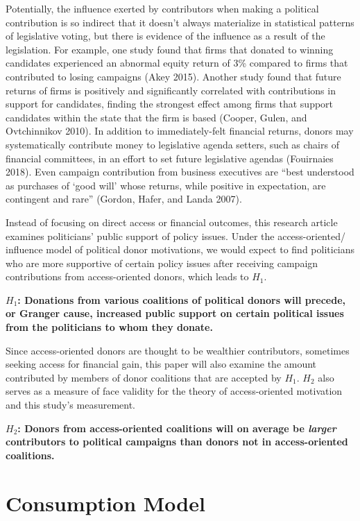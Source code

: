 \documentclass[12pt,]{article}
\begin{document}
Potentially, the influence exerted by contributors when making a
political contribution is so indirect that it doesn't always materialize
in statistical patterns of legislative voting, but there is evidence of
the influence as a result of the legislation. For example, one study
found that firms that donated to winning candidates experienced an
abnormal equity return of 3\% compared to firms that contributed to
losing campaigns (Akey 2015). Another study found that future returns of
firms is positively and significantly correlated with contributions in
support for candidates, finding the strongest effect among firms that
support candidates within the state that the firm is based (Cooper,
Gulen, and Ovtchinnikov 2010). In addition to immediately-felt financial
returns, donors may systematically contribute money to legislative
agenda setters, such as chairs of financial committees, in an effort to
set future legislative agendas (Fouirnaies 2018). Even campaign
contribution from business executives are ``best understood as purchases
of `good will' whose returns, while positive in expectation, are
contingent and rare'' (Gordon, Hafer, and Landa 2007).

Instead of focusing on direct access or financial outcomes, this
research article examines politicians' public support of policy issues.
Under the access-oriented/ influence model of political donor
motivations, we would expect to find politicians who are more supportive
of certain policy issues after receiving campaign contributions from
access-oriented donors, which leads to \(H_{1}\).

\textbf{\(H_{1}\): Donations from various coalitions of political donors
will precede, or Granger cause, increased public support on certain
political issues from the politicians to whom they donate.}

Since access-oriented donors are thought to be wealthier contributors,
sometimes seeking access for financial gain, this paper will also
examine the amount contributed by members of donor coalitions that are
accepted by \(H_{1}\). \(H_{2}\) also serves as a measure of face
validity for the theory of access-oriented motivation and this study's
measurement.

\textbf{\(H_{2}\): Donors from access-oriented coalitions will on
average be \emph{larger} contributors to political campaigns than donors
not in access-oriented coalitions.}

\hypertarget{consumption-model}{%
\section{Consumption Model}\label{consumption-model}}
\end{document}
